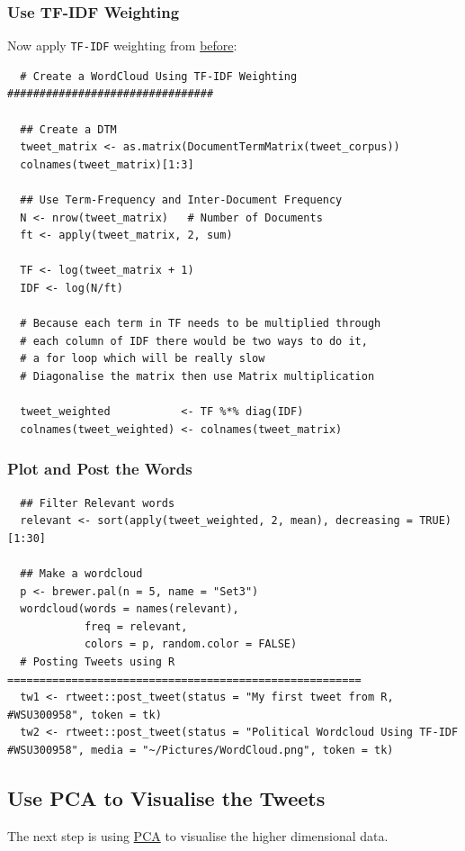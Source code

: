 \documentclass[11pt]{article}
\begin{document}
\subsubsection{Use TF-IDF Weighting}
\label{sec:orgafb360e}
Now apply \texttt{TF-IDF} weighting from
\href{04\_TM\_Index\_Querying\_TF-IDF.md}{before}:

\begin{verbatim}
  # Create a WordCloud Using TF-IDF Weighting ################################

  ## Create a DTM
  tweet_matrix <- as.matrix(DocumentTermMatrix(tweet_corpus))
  colnames(tweet_matrix)[1:3]

  ## Use Term-Frequency and Inter-Document Frequency
  N <- nrow(tweet_matrix)   # Number of Documents
  ft <- apply(tweet_matrix, 2, sum)

  TF <- log(tweet_matrix + 1)
  IDF <- log(N/ft)

  # Because each term in TF needs to be multiplied through
  # each column of IDF there would be two ways to do it,
  # a for loop which will be really slow
  # Diagonalise the matrix then use Matrix multiplication

  tweet_weighted           <- TF %*% diag(IDF)
  colnames(tweet_weighted) <- colnames(tweet_matrix)
\end{verbatim}

\subsubsection{Plot and Post the Words}
\label{sec:org08cea15}
\begin{verbatim}
  ## Filter Relevant words
  relevant <- sort(apply(tweet_weighted, 2, mean), decreasing = TRUE)[1:30]

  ## Make a wordcloud
  p <- brewer.pal(n = 5, name = "Set3")
  wordcloud(words = names(relevant),
            freq = relevant,
            colors = p, random.color = FALSE)
  # Posting Tweets using R =======================================================
  tw1 <- rtweet::post_tweet(status = "My first tweet from R, #WSU300958", token = tk)
  tw2 <- rtweet::post_tweet(status = "Political Wordcloud Using TF-IDF #WSU300958", media = "~/Pictures/WordCloud.png", token = tk)
\end{verbatim}

\subsection{Use PCA to Visualise the Tweets}
\label{sec:org5745d01}
The next step is using
\href{../../Programming/R/IntroDataSci/PCA-PrincipalComponentAnalysis\_10\_IntroDataSci.md}{PCA}
to visualise the higher dimensional data.
\end{document}
